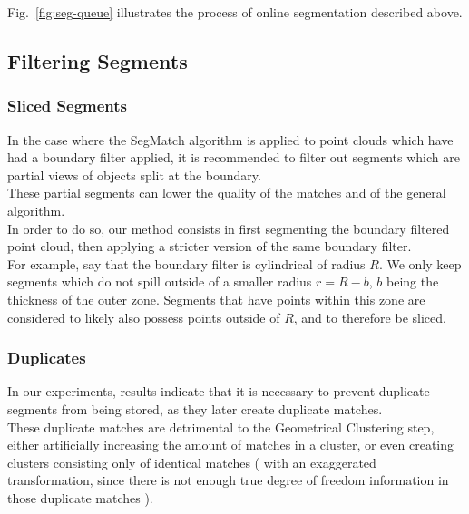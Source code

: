 Fig.~\ref{fig:seg-queue} illustrates the process of online segmentation described above.
\subsection{Filtering Segments}

\label{subsec:filtering-segments}

\subsubsection{Sliced Segments}
\label{subsub:sec:sliced}

In the case where the SegMatch algorithm is applied to point clouds which have had a boundary filter applied, it is recommended to filter out segments which are partial views of objects split at the boundary.\\

These partial segments can lower the quality of the matches and of the general algorithm.\\

In order to do so, our method consists in first segmenting the boundary filtered point cloud, then applying a stricter version of the same boundary filter.\\

For example, say that the boundary filter is cylindrical of radius $R$. We only keep segments which do not spill outside of a smaller radius $r = R-b$, $b$ being the thickness of the outer zone. Segments that have points within this zone are considered to likely also possess points outside of $R$, and to therefore be sliced.\\

\subsubsection{Duplicates}
\label{subsub:sec:duplicates}

In our experiments, results indicate that it is necessary to prevent duplicate segments from being stored, as they later create duplicate matches.\\ 

These duplicate matches are detrimental to the Geometrical Clustering step, either artificially increasing the amount of matches in a cluster, or even creating clusters consisting only of identical matches ( with an exaggerated transformation, since there is not enough true degree of freedom information in those duplicate matches ).


